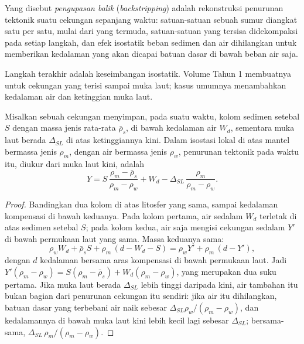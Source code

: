 \begin{definition}\label{def:b2:basins-compared:backstripping}
Yang disebut \emph{pengupasan balik} (\textit{backstripping}) adalah rekonstruksi penurunan tektonik suatu
cekungan sepanjang waktu: satuan-satuan sebuah sumur diangkat satu per satu, mulai dari yang termuda, satuan-satuan
yang tersisa didekompaksi pada setiap langkah, dan efek isostatik beban sedimen dan air
dihilangkan untuk memberikan kedalaman yang akan dicapai batuan dasar di bawah beban air saja.
\end{definition}

Langkah terakhir adalah keseimbangan isostatik. Volume Tahun 1 membuatnya untuk cekungan yang terisi sampai muka laut;
kasus umumnya menambahkan kedalaman air dan ketinggian muka laut.

\begin{proposition}\label{prop:b2:basins-compared:backstrip}
Misalkan sebuah cekungan menyimpan, pada suatu waktu, kolom sedimen setebal $S$ dengan massa jenis rata-rata
$\bar\rho_s$, di bawah kedalaman air $W_d$, sementara muka laut berada $\Delta_{SL}$ di atas ketinggiannya kini.
Dalam isostasi lokal di atas mantel bermassa jenis $\rho_m$, dengan air bermassa jenis $\rho_w$,
penurunan tektonik pada waktu itu, diukur dari muka laut kini, adalah
\[
  Y = S\,\frac{\rho_m - \bar\rho_s}{\rho_m - \rho_w} + W_d
      - \Delta_{SL}\,\frac{\rho_m}{\rho_m - \rho_w}.
\]
\end{proposition}

\begin{proof}
Bandingkan dua kolom di atas litosfer yang sama, sampai kedalaman kompensasi di bawah keduanya. Pada
kolom pertama, air sedalam $W_d$ terletak di atas sedimen setebal $S$; pada kolom kedua, air
saja mengisi cekungan sedalam $Y'$ di bawah permukaan laut yang sama. Massa keduanya sama:
\[
  \rho_w W_d + \bar\rho_s S + \rho_m\,(d - W_d - S) = \rho_w Y' + \rho_m\,(d - Y'),
\]
dengan $d$ kedalaman bersama aras kompensasi di bawah permukaan laut. Jadi
$Y'(\rho_m - \rho_w) = S(\rho_m - \bar\rho_s) + W_d(\rho_m - \rho_w)$, yang merupakan dua suku
pertama. Jika muka laut berada $\Delta_{SL}$ lebih tinggi daripada kini, air tambahan itu bukan bagian dari
penurunan cekungan itu sendiri: jika air itu dihilangkan, batuan dasar yang terbebani air naik sebesar
$\Delta_{SL}\rho_w/(\rho_m - \rho_w)$, dan kedalamannya di bawah muka laut kini lebih kecil lagi sebesar
$\Delta_{SL}$; bersama-sama, $\Delta_{SL}\,\rho_m/(\rho_m - \rho_w)$.
\end{proof}

